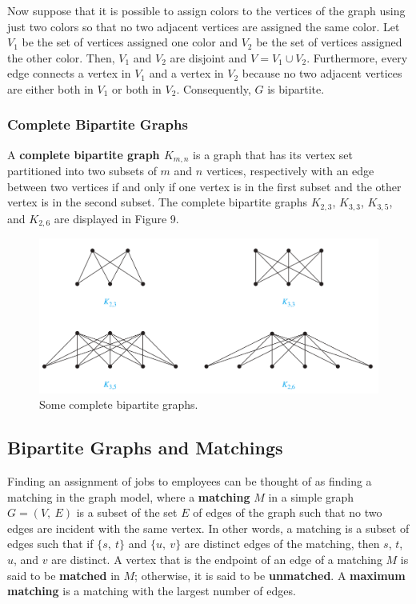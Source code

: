\documentclass[11pt]{article}
\begin{document}
Now suppose that it is possible to assign colors to the vertices of the graph using just two colors so that no two adjacent vertices are assigned the same color. Let $V_1$ be the set of vertices assigned one color and $V_2$ be the set of vertices assigned the other color. Then, $V_1$ and $V_2$ are disjoint and $V = V_1 \cup V_2$. Furthermore, every edge connects a vertex in $V_1$ and a vertex in $V_2$ because no two adjacent vertices are either both in $V_1$ or both in $V_2$. Consequently, $G$ is bipartite.

\subsubsection{Complete Bipartite Graphs}

A \textbf{complete bipartite graph $K_{m,n}$} is a graph that has its vertex
set partitioned into two subsets of $m$ and $n$ vertices, respectively with an edge between two vertices if and only if one vertex is in the first subset and the other vertex is in the second subset. The complete bipartite graphs $K_{2,3}$, $K_{3,3}$, $K_{3,5}$, and $K_{2,6}$ are displayed in Figure 9.

\setcounter{figure}{8}
\begin{figure}[h!]
    \centering
    \includegraphics[width=.6\textwidth]{img/ch10.2-figure9.png}
    \caption{Some complete bipartite graphs.}
    \label{fig:my_label}
\end{figure}

\subsection{Bipartite Graphs and Matchings}

Finding an assignment of jobs to employees can be thought of as finding a matching in the graph model, where a \textbf{matching} $M$ in a simple graph $G = (V,\ E)$ is a subset of the set $E$ of edges of the graph such that no two edges are incident with the same vertex. In other words, a matching is a subset of edges such that if $\{s,\ t\}$ and $\{u,\ v\}$ are distinct edges of the matching, then $s$, $t$, $u$, and $v$ are distinct. A vertex that is the endpoint of an edge of a matching $M$ is said to be \textbf{matched} in $M$; otherwise, it is said to be \textbf{unmatched}. A \textbf{maximum matching} is a matching with the largest number of edges. 
\end{document}
